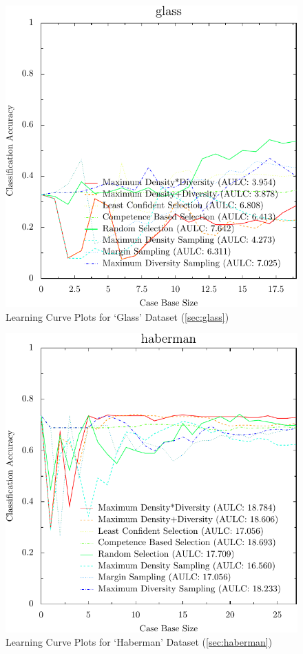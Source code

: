 \documentclass[a4paper,11pt]{report}
\begin{document}
\begin{figure}[h!]
\includegraphics{./Plots/glass}
\caption{Learning Curve Plots for `Glass' Dataset (\ref{sec:glass})}
\end{figure}

\begin{figure}[h!]
\includegraphics{./Plots/haberman}
\caption{Learning Curve Plots for `Haberman' Dataset (\ref{sec:haberman})}
\end{figure}
\end{document}
